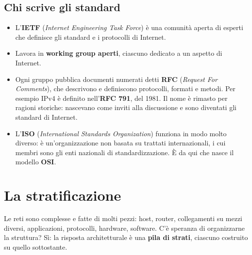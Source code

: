 \subsection{Chi scrive gli standard}

\begin{itemize}
    \item L'\textbf{IETF} (\emph{Internet Engineering Task Force}) è una comunità aperta di esperti che
          definisce gli standard e i protocolli di Internet.
    \item Lavora in \textbf{working group aperti}, ciascuno dedicato a un aspetto di Internet.
    \item Ogni gruppo pubblica documenti numerati detti \textbf{RFC} (\emph{Request For Comments}), che
          descrivono e definiscono protocolli, formati e metodi. Per esempio IPv4 è definito
          nell'\textbf{RFC 791}, del 1981. Il nome è rimasto per ragioni storiche: nascevano come inviti
          alla discussione e sono diventati gli standard di Internet.
    \item L'\textbf{ISO} (\emph{International Standards Organization}) funziona in modo molto diverso: è
          un'organizzazione non basata su trattati internazionali, i cui membri sono gli enti nazionali
          di standardizzazione. È da qui che nasce il modello \textbf{OSI}.
\end{itemize}


\section{La stratificazione}

Le reti sono complesse e fatte di molti pezzi: host, router, collegamenti su mezzi diversi,
applicazioni, protocolli, hardware, software. C'è speranza di organizzarne la struttura? Sì:
la risposta architetturale è una \textbf{pila di strati}, ciascuno costruito su quello sottostante.

